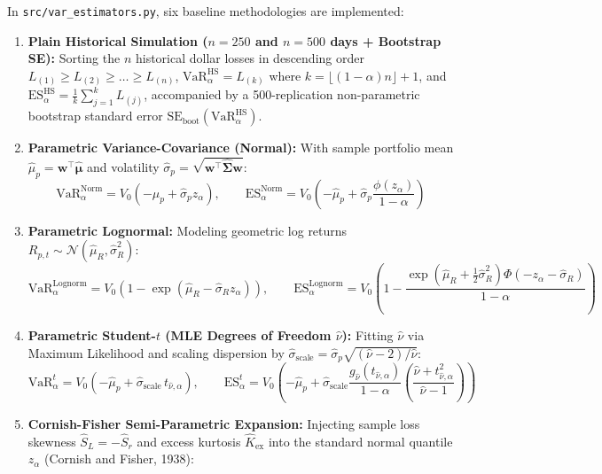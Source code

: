 \documentclass[11pt,a4paper]{article}
\begin{document}
In \texttt{src/var\_estimators.py}, six baseline methodologies are implemented:
\begin{enumerate}
    \item \textbf{Plain Historical Simulation ($n=250$ and $n=500$ days + Bootstrap SE):} Sorting the $n$ historical dollar losses in descending order $L_{(1)} \ge L_{(2)} \ge \dots \ge L_{(n)}$, $\text{VaR}_\alpha^{\text{HS}} = L_{(k)}$ where $k = \lfloor (1-\alpha)n \rfloor + 1$, and $\text{ES}_\alpha^{\text{HS}} = \frac{1}{k}\sum_{j=1}^k L_{(j)}$, accompanied by a 500-replication non-parametric bootstrap standard error $\text{SE}_{\text{boot}}(\text{VaR}_\alpha^{\text{HS}})$.
    \item \textbf{Parametric Variance-Covariance (Normal):} With sample portfolio mean $\hat{\mu}_p = \mathbf{w}^\top\hat{\boldsymbol{\mu}}$ and volatility $\hat{\sigma}_p = \sqrt{\mathbf{w}^\top\hat{\mathbf{\Sigma}}\mathbf{w}}$:
    \begin{equation}
    \text{VaR}_\alpha^{\text{Norm}} = V_0\left(-\hat{\mu}_p + \hat{\sigma}_p z_\alpha\right), \qquad \text{ES}_\alpha^{\text{Norm}} = V_0\left(-\hat{\mu}_p + \hat{\sigma}_p \frac{\phi(z_\alpha)}{1-\alpha}\right)
    \end{equation}
    \item \textbf{Parametric Lognormal:} Modeling geometric log returns $R_{p,t} \sim \mathcal{N}(\hat{\mu}_R, \hat{\sigma}_R^2)$:
    \begin{equation}
    \text{VaR}_\alpha^{\text{Lognorm}} = V_0\left(1 - \exp(\hat{\mu}_R - \hat{\sigma}_R z_\alpha)\right), \qquad \text{ES}_\alpha^{\text{Lognorm}} = V_0\left(1 - \frac{\exp(\hat{\mu}_R + \frac{1}{2}\hat{\sigma}_R^2)\Phi(-z_\alpha - \hat{\sigma}_R)}{1-\alpha}\right)
    \end{equation}
    \item \textbf{Parametric Student-$t$ (MLE Degrees of Freedom $\hat{\nu}$):} Fitting $\hat{\nu}$ via Maximum Likelihood and scaling dispersion by $\hat{\sigma}_{\text{scale}} = \hat{\sigma}_p\sqrt{(\hat{\nu}-2)/\hat{\nu}}$:
    \begin{equation}
    \text{VaR}_\alpha^{t} = V_0\left(-\hat{\mu}_p + \hat{\sigma}_{\text{scale}}\,t_{\hat{\nu},\alpha}\right), \qquad \text{ES}_\alpha^{t} = V_0\left(-\hat{\mu}_p + \hat{\sigma}_{\text{scale}}\frac{g_{\hat{\nu}}(t_{\hat{\nu},\alpha})}{1-\alpha}\left(\frac{\hat{\nu} + t_{\hat{\nu},\alpha}^2}{\hat{\nu}-1}\right)\right)
    \end{equation}
    \item \textbf{Cornish-Fisher Semi-Parametric Expansion:} Injecting sample loss skewness $\hat{S}_L = -\hat{S}_r$ and excess kurtosis $\hat{K}_{\text{ex}}$ into the standard normal quantile $z_\alpha$ (Cornish and Fisher, 1938):

\end{enumerate}
\end{document}
